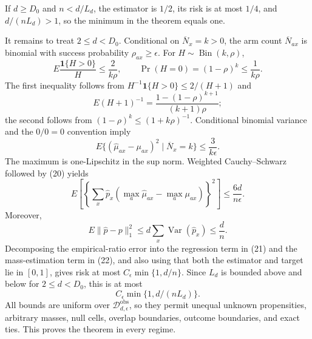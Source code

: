 If \(d\geq D_0\) and \(n<d/L_d\), the estimator is \(1/2\), its risk is at most \(1/4\), and \(d/(nL_d)>1\), so the minimum in the theorem equals one.

It remains to treat \(2\leq d<D_0\).  Conditional on \(\overline N_x=k>0\), the arm count \(\overline N_{ax}\) is binomial with success probability \(\rho_{ax}\geq\epsilon\).  For \(H\sim\operatorname{Bin}(k,\rho)\),
\[
 E\frac{\mathbf1\{H>0\}}H\leq\frac2{k\rho},
 \qquad
 \Pr(H=0)=(1-\rho)^k\leq\frac1{k\rho}.                            \tag{19}
\]
The first inequality follows from \(H^{-1}\mathbf1\{H>0\}\leq2/(H+1)\) and
\[
 E(H+1)^{-1}=\frac{1-(1-\rho)^{k+1}}{(k+1)\rho};
\]
the second follows from \((1-\rho)^k\leq(1+k\rho)^{-1}\).  Conditional binomial variance and the \(0/0=0\) convention imply
\[
 E\{(\widehat\mu_{ax}-\mu_{ax})^2\mid\overline N_x=k\}
 \leq\frac3{k\epsilon}.                                            \tag{20}
\]
The maximum is one-Lipschitz in the sup norm.  Weighted Cauchy--Schwarz followed by (20) yields
\[
 E\left[
 \left\{\sum_x\widehat p_x
 (\max_a\widehat\mu_{ax}-\max_a\mu_{ax})\right\}^2\right]
 \leq\frac{6d}{n\epsilon}.                                         \tag{21}
\]
Moreover,
\[
 E\lVert\widehat p-p\rVert_1^2
 \leq d\sum_x\operatorname{Var}(\widehat p_x)\leq\frac dn.       \tag{22}
\]
Decomposing the empirical-ratio error into the regression term in (21) and the mass-estimation term in (22), and also using that both the estimator and target lie in \([0,1]\), gives risk at most \(C_\epsilon\min\{1,d/n\}\).  Since \(L_d\) is bounded above and below for \(2\leq d<D_0\), this is at most
\[
 C_\epsilon\min\{1,d/(nL_d)\}.
\]
All bounds are uniform over \(\mathcal D_{d,\epsilon}^{\mathrm{obs}}\), so they permit unequal unknown propensities, arbitrary masses, null cells, overlap boundaries, outcome boundaries, and exact ties.  This proves the theorem in every regime.